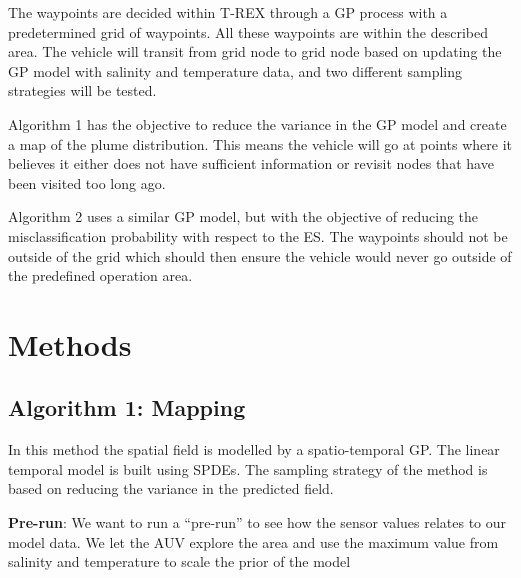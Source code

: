 \documentclass{article}
\begin{document}
The waypoints are decided within T-REX through a GP process with a predetermined grid of waypoints. All these waypoints are within the described area.  The vehicle will transit from grid node to grid node based on updating the GP model with salinity and temperature data, and two different sampling strategies will be tested. 

Algorithm 1 has the objective to reduce the variance in the GP model and create a map of the plume distribution. This means the vehicle will go at points where it believes it either does not have sufficient information or revisit nodes that have been visited too long ago. 

Algorithm 2 uses a similar GP model, but with the objective of reducing the misclassification probability with respect to the ES. The waypoints should not be outside of the grid which should then ensure the vehicle would never go outside of the predefined operation area.




	

\section*{Methods}
\subsection*{Algorithm 1: Mapping}
In this method the spatial field is modelled by a spatio-temporal GP. The linear temporal model is built using SPDEs. The sampling strategy of the method is based on reducing the variance in the predicted field. 

\textbf{Pre-run}: We want to run a “pre-run” to see how the sensor values relates to our model data. We let the AUV explore the area and use the maximum value from salinity and temperature to scale the prior of the model 
\end{document}
